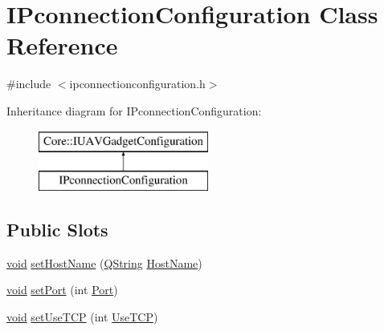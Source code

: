\hypertarget{class_i_pconnection_configuration}{\section{\-I\-Pconnection\-Configuration \-Class \-Reference}
\label{class_i_pconnection_configuration}
}


{\ttfamily \#include $<$ipconnectionconfiguration.\-h$>$}

\-Inheritance diagram for \-I\-Pconnection\-Configuration\-:\begin{figure}[H]
\begin{center}
\leavevmode
\includegraphics[height=2.000000cm]{class_i_pconnection_configuration}
\end{center}
\end{figure}
\subsection*{\-Public \-Slots}
\begin{DoxyCompactItemize}
\item 
\hyperlink{group___u_a_v_objects_plugin_ga444cf2ff3f0ecbe028adce838d373f5c}{void} \hyperlink{group___i_p_conn_plugin_ga88855a0ecb5df4caaf47450815ff761a}{set\-Host\-Name} (\hyperlink{group___u_a_v_objects_plugin_gab9d252f49c333c94a72f97ce3105a32d}{\-Q\-String} \hyperlink{group___i_p_conn_plugin_gaa540a20af79b7ec845405fb81a75dd82}{\-Host\-Name})
\item 
\hyperlink{group___u_a_v_objects_plugin_ga444cf2ff3f0ecbe028adce838d373f5c}{void} \hyperlink{group___i_p_conn_plugin_gacce8d065ea6dd85639e0e1aea893ce9c}{set\-Port} (int \hyperlink{group___i_p_conn_plugin_ga016b44f60ba95951cdf428d88a119a97}{\-Port})
\item 
\hyperlink{group___u_a_v_objects_plugin_ga444cf2ff3f0ecbe028adce838d373f5c}{void} \hyperlink{group___i_p_conn_plugin_ga58320607e7ef94199aa35fd7b7b4df21}{set\-Use\-T\-C\-P} (int \hyperlink{group___i_p_conn_plugin_ga40b7a131ca4ee4e1c315a0fc12281da8}{\-Use\-T\-C\-P})
\end{DoxyCompactItemize}
